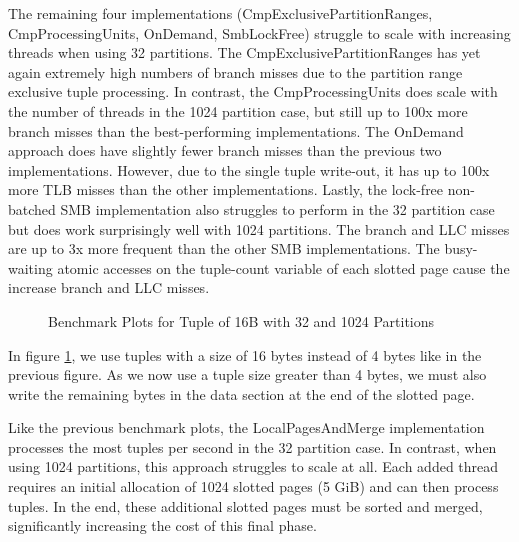 The remaining four implementations (CmpExclusivePartitionRanges, CmpProcessingUnits, OnDemand, SmbLockFree) struggle to scale with increasing threads when using 32 partitions.
The CmpExclusivePartitionRanges has yet again extremely high numbers of branch misses due to the partition range exclusive tuple processing.
In contrast, the CmpProcessingUnits does scale with the number of threads in the 1024 partition case, but still up to 100x more branch misses than the best-performing implementations.
The OnDemand approach does have slightly fewer branch misses than the previous two implementations.
However, due to the single tuple write-out, it has up to 100x more \ac{TLB} misses than the other implementations.
Lastly, the lock-free non-batched \ac{SMB} implementation also struggles to perform in the 32 partition case but does work surprisingly well with 1024 partitions.
The branch and LLC misses are up to 3x more frequent than the other \ac{SMB} implementations.
The busy-waiting atomic accesses on the tuple-count variable of each slotted page cause the increase branch and LLC misses.
\begin{figure}[h]
  \centering
  \begin{subfigure}{.49\textwidth}
    \centering
    \resizebox{\linewidth}{!}{}
  \end{subfigure}
  \begin{subfigure}{.49\textwidth}
    \centering
    \resizebox{\linewidth}{!}{}
  \end{subfigure}
  \begin{subfigure}{\textwidth}
    \centering
    \resizebox{\linewidth}{!}{}
  \end{subfigure}
  \caption[Shuffle Benchmark Plots for Tuple of 16B with 32 and 1024 Partitions]{Benchmark Plots for Tuple of 16B with 32 and 1024 Partitions}
  \label{plot-shuffle-16B-32-1024}
\end{figure}

In figure \ref{plot-shuffle-16B-32-1024}, we use tuples with a size of 16 bytes instead of 4 bytes like in the previous figure.
As we now use a tuple size greater than 4 bytes, we must also write the remaining bytes in the data section at the end of the slotted page.

Like the previous benchmark plots, the LocalPagesAndMerge implementation processes the most tuples per second in the 32 partition case.
In contrast, when using 1024 partitions, this approach struggles to scale at all.
Each added thread requires an initial allocation of 1024 slotted pages (5 GiB) and can then process tuples.
In the end, these additional slotted pages must be sorted and merged, significantly increasing the cost of this final phase.

